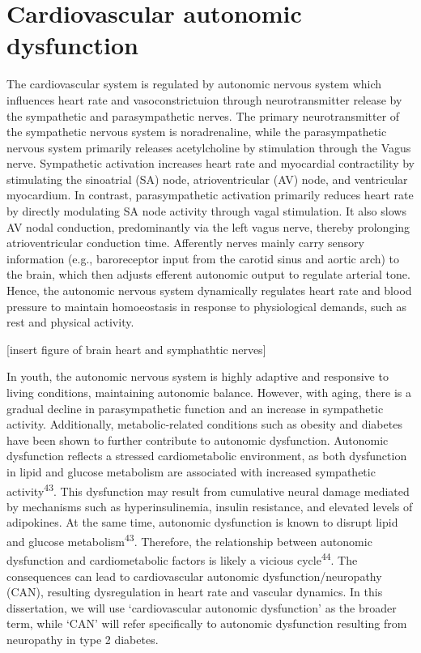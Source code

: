 \documentclass[
  a4paper,
  headsepline=true,
  open=any]{scrbook}
\begin{document}
\hypertarget{cardiovascular-autonomic-dysfunction}{%
\section{Cardiovascular autonomic
dysfunction}\label{cardiovascular-autonomic-dysfunction}}

The cardiovascular system is regulated by autonomic nervous system which
influences heart rate and vasoconstrictuion through neurotransmitter
release by the sympathetic and parasympathetic nerves. The primary
neurotransmitter of the sympathetic nervous system is noradrenaline,
while the parasympathetic nervous system primarily releases
acetylcholine by stimulation through the Vagus nerve. Sympathetic
activation increases heart rate and myocardial contractility by
stimulating the sinoatrial (SA) node, atrioventricular (AV) node, and
ventricular myocardium. In contrast, parasympathetic activation
primarily reduces heart rate by directly modulating SA node activity
through vagal stimulation. It also slows AV nodal conduction,
predominantly via the left vagus nerve, thereby prolonging
atrioventricular conduction time. Afferently nerves mainly carry sensory
information (e.g., baroreceptor input from the carotid sinus and aortic
arch) to the brain, which then adjusts efferent autonomic output to
regulate arterial tone. Hence, the autonomic nervous system dynamically
regulates heart rate and blood pressure to maintain homoeostasis in
response to physiological demands, such as rest and physical activity.

{[}insert figure of brain heart and symphathtic nerves{]}

In youth, the autonomic nervous system is highly adaptive and responsive
to living conditions, maintaining autonomic balance. However, with
aging, there is a gradual decline in parasympathetic function and an
increase in sympathetic activity. Additionally, metabolic-related
conditions such as obesity and diabetes have been shown to further
contribute to autonomic dysfunction. Autonomic dysfunction reflects a
stressed cardiometabolic environment, as both dysfunction in lipid and
glucose metabolism are associated with increased sympathetic
activity\textsuperscript{43}. This dysfunction may result from
cumulative neural damage mediated by mechanisms such as
hyperinsulinemia, insulin resistance, and elevated levels of adipokines.
At the same time, autonomic dysfunction is known to disrupt lipid and
glucose metabolism\textsuperscript{43}. Therefore, the relationship
between autonomic dysfunction and cardiometabolic factors is likely a
vicious cycle\textsuperscript{44}. The consequences can lead to
cardiovascular autonomic dysfunction/neuropathy (CAN), resulting
dysregulation in heart rate and vascular dynamics. In this dissertation,
we will use `cardiovascular autonomic dysfunction' as the broader term,
while `CAN' will refer specifically to autonomic dysfunction resulting
from neuropathy in type 2 diabetes.
\end{document}
